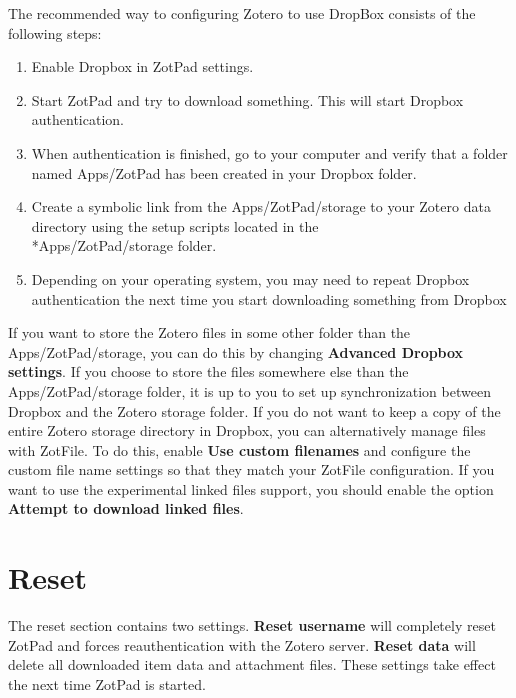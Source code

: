 \documentclass[oneside, openany, 12pt]{tufte-book}
\newcommand{\ipadfootnote}[1]{}
\newcommand{\ipadfootnote}[1]{\footnote{#1}}
\begin{document}
The recommended way to configuring Zotero to use DropBox consists of the following steps:

\begin{enumerate}
\item Enable Dropbox in ZotPad settings.
\item Start ZotPad and try to download something. This will start Dropbox authentication.
\item When authentication is finished, go to your computer and verify that a folder named Apps/ZotPad has been created in your Dropbox folder.
\item Create a symbolic link from the Apps/ZotPad/storage to your Zotero data directory using the setup scripts located in the\\*Apps/ZotPad/storage folder.
\item Depending on your operating system, you may need to repeat Dropbox authentication the next time you start downloading something from Dropbox
\end{enumerate}

If you want to store the Zotero files in some other folder than the Apps/ZotPad/storage, you can do this by changing \textbf{Advanced Dropbox settings}. If you choose to store the files somewhere else than the Apps/ZotPad/storage folder, it is up to you to set up synchronization between Dropbox and the Zotero storage folder\ipadfootnote{Although it is possible to put the entire Zotero data directory inside Dropbox, this is not recommended. Doing so will cause your database and its journal file to be synchronized to Dropbox cloud. This will create a large amount of unnecessary network traffic. Additionally, if you use Zotero on two different computers with this setup, there is a high risk of corrupting your Zotero database.}. If you do not want to keep a copy of the entire Zotero storage directory in Dropbox, you can alternatively manage files with ZotFile. To do this, enable \textbf{Use custom filenames} and configure the custom file name settings so that they match your ZotFile configuration. If you want to use the experimental linked files support, you should enable the option \textbf{Attempt to download linked files}.

\section{Reset}

The reset section contains two settings. \textbf{Reset username} will completely reset ZotPad and forces reauthentication with the Zotero server. \textbf{Reset data} will delete all downloaded item data and attachment files. These settings take effect the next time ZotPad is started.
\end{document}
